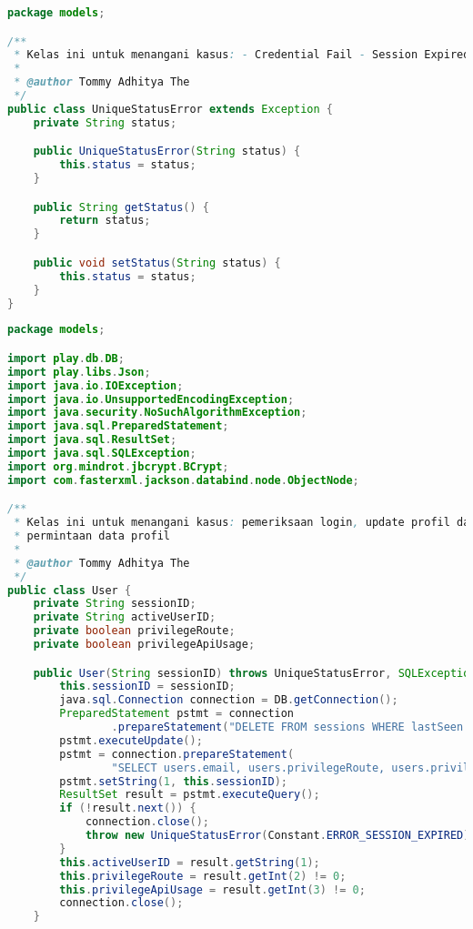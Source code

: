 \begin{lstlisting}[language=Java,basicstyle=\tiny,caption=models/UniqueStatusError.java,label={lst:uniquestatuserror.java}]
package models;

/**
 * Kelas ini untuk menangani kasus: - Credential Fail - Session Expired
 * 
 * @author Tommy Adhitya The
 */
public class UniqueStatusError extends Exception {
	private String status;

	public UniqueStatusError(String status) {
		this.status = status;
	}

	public String getStatus() {
		return status;
	}

	public void setStatus(String status) {
		this.status = status;
	}
}
\end{lstlisting}
\begin{lstlisting}[language=Java,basicstyle=\tiny,caption=models/User.java,label={lst:user.java}]
package models;

import play.db.DB;
import play.libs.Json;
import java.io.IOException;
import java.io.UnsupportedEncodingException;
import java.security.NoSuchAlgorithmException;
import java.sql.PreparedStatement;
import java.sql.ResultSet;
import java.sql.SQLException;
import org.mindrot.jbcrypt.BCrypt;
import com.fasterxml.jackson.databind.node.ObjectNode;

/**
 * Kelas ini untuk menangani kasus: pemeriksaan login, update profil dan
 * permintaan data profil
 * 
 * @author Tommy Adhitya The
 */
public class User {
	private String sessionID;
	private String activeUserID;
	private boolean privilegeRoute;
	private boolean privilegeApiUsage;

	public User(String sessionID) throws UniqueStatusError, SQLException {
		this.sessionID = sessionID;
		java.sql.Connection connection = DB.getConnection();
		PreparedStatement pstmt = connection
				.prepareStatement("DELETE FROM sessions WHERE lastSeen < (NOW() - INTERVAL 6 HOUR)");
		pstmt.executeUpdate();
		pstmt = connection.prepareStatement(
				"SELECT users.email, users.privilegeRoute, users.privilegeApiUsage FROM users LEFT JOIN sessions ON users.email = sessions.email WHERE sessions.sessionId =?");
		pstmt.setString(1, this.sessionID);
		ResultSet result = pstmt.executeQuery();
		if (!result.next()) {
			connection.close();
			throw new UniqueStatusError(Constant.ERROR_SESSION_EXPIRED);
		}
		this.activeUserID = result.getString(1);
		this.privilegeRoute = result.getInt(2) != 0;
		this.privilegeApiUsage = result.getInt(3) != 0;
		connection.close();
	}


\end{lstlisting}

